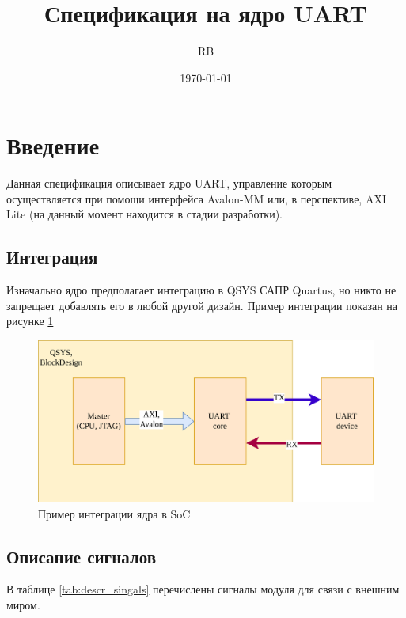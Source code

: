 \documentclass[a4paper,12pt]{article}
\title{\Huge\textbf{Спецификация на ядро UART}}
\author{\huge RB}
\date{\today}
\begin{document}
\maketitle
\newpage


%
%
\listoffigures
{}
\newpage

%
\listoftables
{}
\newpage


%
%
%
%
\section{Введение}
\label{sec:introduction}

Данная спецификация описывает ядро UART, управление которым осуществляется при помощи интерфейса Avalon-MM или, в перспективе, AXI Lite (на данный момент находится в стадии разработки).

    \subsection{Интеграция}
    Изначально ядро предполагает интеграцию в QSYS САПР Quartus, но никто не запрещает добавлять его в любой другой дизайн. Пример интеграции показан на рисунке \ref{img:integrated_ip}

    \begin{figure}[H]
        \centering
        \includegraphics[width=15cm]{Integrate.png}
        \caption{Пример интеграции ядра в SoC}
        \label{img:integrated_ip}
    \end{figure}


    \subsection{Описание сигналов}

    В таблице \ref{tab:descr_singals} перечислены сигналы модуля для связи с внешним миром.
\end{document}
